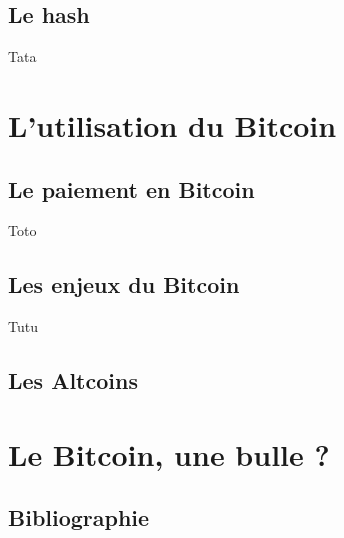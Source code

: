 \documentclass{bredele} %
\begin{document}
    \chapter[Le hash]{Le hash}
    Tata

    \part[L'utilisation du Bitcoin]{L'utilisation du Bitcoin}
    \chapter[Le paiement en Bitcoin]{Le paiement en Bitcoin}
    Toto
    \chapter[Les enjeux du Bitcoin]{Les enjeux du Bitcoin}
    Tutu
    \chapter[Les Altcoins]{Les Altcoins}

    \part[Le Bictoin, une bulle ?]{Le Bitcoin, une bulle ?}


    \clearemptydoublepage
    \backmatter

    \clearemptydoublepage
    \chapter*{Bibliographie}


    \nocite{*} %
    \printbibliography[heading=primary,keyword=primary]
    \newpage
    \nocite{*}
    \printbibliography[heading=secondary,keyword=secondary]

    \newpage
    \clearemptydoublepage
\end{document}
